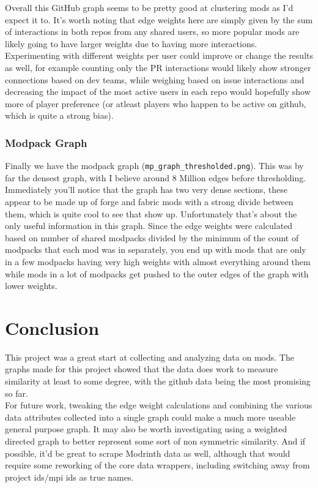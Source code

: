 \documentclass[a4paper,11pt, twocolumn]{article}
\begin{document}
Overall this GitHub graph seems to be pretty good at clustering mods as I'd expect it to. It's worth noting that edge weights here are simply given by the sum of interactions in both repos from any shared users, so more popular mods are likely going to have larger weights due to having more interactions. Experimenting with different weights per user could improve or change the results as well, for example counting only the PR interactions would likely show stronger connections based on dev teams, while weighing based on issue interactions and decreasing the impact of the most active users in each repo would hopefully show more of player preference (or atleast players who happen to be active on github, which is quite a strong bias).

\subsubsection{Modpack Graph}

Finally we have the modpack graph (\verb|mp_graph_thresholded.png|). This was by far the densest graph, with I believe around 8 Million edges before thresholding. Immediately you'll notice that the graph has two very dense sections, these appear to be made up of forge and fabric mods with a strong divide between them, which is quite cool to see that show up. Unfortunately that's about the only useful information in this graph. Since the edge weights were calculated based on number of shared modpacks divided by the minimum of the count of modpacks that each mod was in separately, you end up with mods that are only in a few modpacks having very high weights with almost everything around them while mods in a lot of modpacks get pushed to the outer edges of the graph with lower weights.

\section{Conclusion}

This project was a great start at collecting and analyzing data on mods. The graphs made for this project showed that the data does work to measure similarity at least to some degree, with the github data being the most promising so far.\\

For future work, tweaking the edge weight calculations and combining the various data attributes collected into a single graph could make a much more useable general purpose graph. It may also be worth investigating using a weighted directed graph to better represent some sort of non symmetric similarity. And if possible, it'd be great to scrape Modrinth data as well, although that would require some reworking of the core data wrappers, including switching away from project ids/mpi ids as true names.
\end{document}
